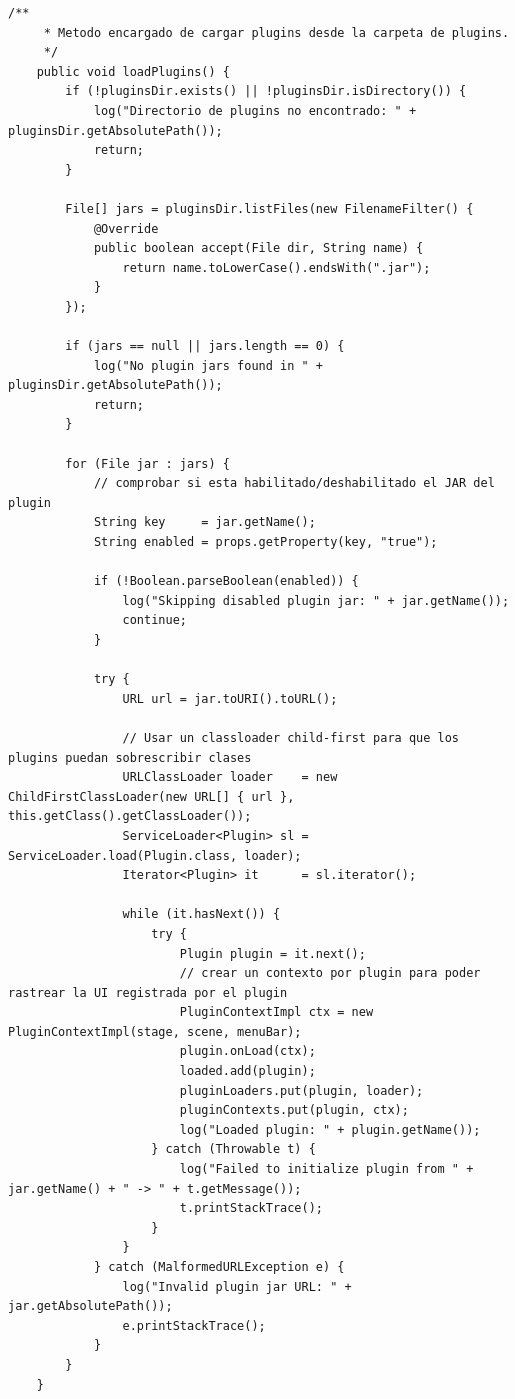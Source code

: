 \documentclass[../../main.tex]{subfiles}
\begin{document}
\begin{lstlisting}[style=mystyle, caption={Método encargado de cargar plugins desde la carpeta de plugins}, label={lst:codigo_carga_plugins}] 
    /**
     * Metodo encargado de cargar plugins desde la carpeta de plugins.
     */
    public void loadPlugins() {
        if (!pluginsDir.exists() || !pluginsDir.isDirectory()) {
            log("Directorio de plugins no encontrado: " + pluginsDir.getAbsolutePath());
            return;
        }

        File[] jars = pluginsDir.listFiles(new FilenameFilter() {
            @Override
            public boolean accept(File dir, String name) {
                return name.toLowerCase().endsWith(".jar");
            }
        });

        if (jars == null || jars.length == 0) {
            log("No plugin jars found in " + pluginsDir.getAbsolutePath());
            return;
        }

        for (File jar : jars) {
            // comprobar si esta habilitado/deshabilitado el JAR del plugin
            String key     = jar.getName();
            String enabled = props.getProperty(key, "true");

            if (!Boolean.parseBoolean(enabled)) {
                log("Skipping disabled plugin jar: " + jar.getName());
                continue;
            }

            try {
                URL url = jar.toURI().toURL();
                
                // Usar un classloader child-first para que los plugins puedan sobrescribir clases
                URLClassLoader loader    = new ChildFirstClassLoader(new URL[] { url }, this.getClass().getClassLoader());
                ServiceLoader<Plugin> sl = ServiceLoader.load(Plugin.class, loader);
                Iterator<Plugin> it      = sl.iterator();

                while (it.hasNext()) {
                    try {
                        Plugin plugin = it.next();
                        // crear un contexto por plugin para poder rastrear la UI registrada por el plugin
                        PluginContextImpl ctx = new PluginContextImpl(stage, scene, menuBar);
                        plugin.onLoad(ctx);
                        loaded.add(plugin);
                        pluginLoaders.put(plugin, loader);
                        pluginContexts.put(plugin, ctx);
                        log("Loaded plugin: " + plugin.getName());
                    } catch (Throwable t) {
                        log("Failed to initialize plugin from " + jar.getName() + " -> " + t.getMessage());
                        t.printStackTrace();
                    }
                }
            } catch (MalformedURLException e) {
                log("Invalid plugin jar URL: " + jar.getAbsolutePath());
                e.printStackTrace();
            }
        }
    }
\end{lstlisting}
    
\end{document}
